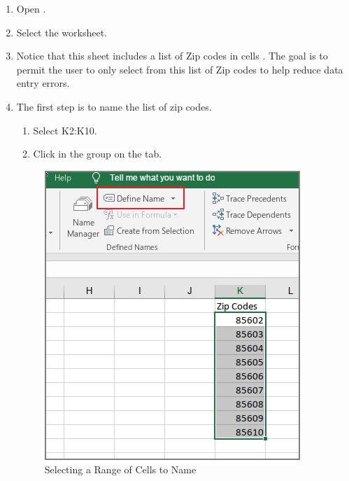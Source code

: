 \begin{enumerate}
	\item Open .
	\item Select the  worksheet.
	\item Notice that this sheet includes a list of Zip codes in cells . The goal is to permit the user to only select from this list of Zip codes to help reduce data entry errors.
	\item The first step is to name the list of zip codes.
	
	\begin{enumerate}
		\item Select K2:K10.
		\item Click  in the  group on the  tab.
		\end{enumerate}
		
		\begin{figure}[H]
			\centering
			\includegraphics[width=\maxwidth{.95\linewidth}]{gfx/ch07_fig33}
			\caption{Selecting a Range of Cells to Name}
			\label{07:fig33}
		\end{figure}
		

\end{enumerate}
